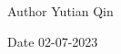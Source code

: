 \begin{DoxyAuthor}{Author}
Yutian Qin 
\end{DoxyAuthor}
\begin{DoxyDate}{Date}
02-\/07-\/2023 
\end{DoxyDate}
